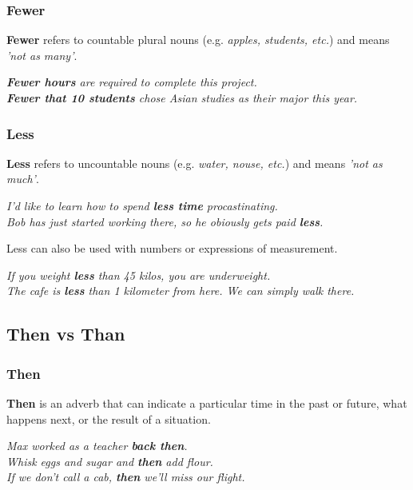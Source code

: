 \documentclass[hidelinks,10pt,a4paper]{article}
\begin{document}
\subsubsection{Fewer}
\textbf{Fewer} refers to countable plural nouns (e.g. \textit{apples, students, etc.}) and means \textit{'not as many'}.
\begin{center}
	\textit{\textbf{Fewer hours} are required to complete this project.} \\
	\textit{\textbf{Fewer that 10 students} chose Asian studies as their major this year.}
\end{center}

\subsubsection{Less}
\textbf{Less} refers to uncountable nouns (e.g. \textit{water, nouse, etc.}) and means \textit{'not as much'}.

\begin{center}
	\textit{I'd like to learn how to spend \textbf{less time} procastinating.}\\
	\textit{Bob has just started working there, so he obiously gets paid \textbf{less}.}
\end{center}

Less can also be used with numbers or expressions of measurement.
\begin{center}
	\textit{If you weight \textbf{less} than 45 kilos, you are underweight.}\\
	\textit{The cafe is \textbf{less} than 1 kilometer from here. We can simply walk there.}
\end{center}

\subsection{Then vs Than}
\subsubsection{Then}
\textbf{Then} is an adverb that can indicate a particular time in the past or future, what happens next, or the result of a situation.

\begin{center}
	\textit{Max worked as a teacher \textbf{back then}.}\\
	\textit{Whisk eggs and sugar and \textbf{then} add flour.}\\
	\textit{If we don't call a cab, \textbf{then} we'll miss our flight.}
\end{center}
\end{document}
